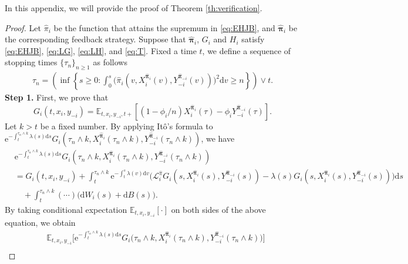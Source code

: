 \documentclass[11pt]{article}
\newcommand \drm {\mathrm{d}}
\newcommand \e {\mathrm{e}}
\numberwithin{equation}{section}
\renewcommand{\theequation}{\arabic{section}.\arabic{equation}}
\newcommand{\bpi}{\boldsymbol{\pi}}
\providecommand{\smn}{{-}} %
\begin{document}
	\setcounter{equation}{0}
	\renewcommand{\theequation}{A.\arabic{equation}}
	In this appendix, we will provide the proof of Theorem \ref{th:verification}.
	\begin{proof}
		Let \(\widehat{\pi}_i\) be the function that attains the supremum in \eqref{eq:EHJB}, and $\widehat{\bpi}_i$ be the corresponding feedback strategy. Suppose that \(\bm{\widehat{\pi}}_i\),
		\(G_i\) and \(H_i\) satisfy \eqref{eq:EHJB},  \eqref{eq:LG}, \eqref{eq:LH}, and \eqref{eq:T}. Fixed a time \(t\), we define a sequence of stopping times \(\{\tau_n\}_{n \ge 1}\) as follows
		\begin{align}
			\tau_n=\left(\inf\left\{s\geq 0:\int_0^s \big(\widehat{\pi}_i(v,X_i^{\widehat{\bm{\pi}}_i}(v),Y^{\widehat{\bpi}_{\smn i}}_{\smn i}(v))\big)^2 \drm v \geq n\right\}\right) \vee t.
		\end{align}
{\bf{Step 1.}} First, we prove that
\[	
G_i(t,x_i,y_{\smn i})=\mathbb{E}_{t,x_i,y_{\smn i},t+}\left[(1-\phi_i/n)X_i^{\widehat{\bm{\pi}}_i}(\tau)-\phi_i Y^{\widehat{\bpi}_{\smn i}}_{\smn i}(\tau)\right].
 \]
 Let \(k>t\) be a fixed number. By applying It\^{o}'s formula to \(\e^{-\int_t^{\tau_n\wedge k}\lambda(s)\drm s} G_i(\tau_n\wedge k,X_i^{\widehat{\bm{\pi}}_i}(\tau_n\wedge k),Y^{\widehat{\bpi}_{\smn i}}_{\smn i}(\tau_n\wedge k))\), we have
		\begin{align*}
			&\e^{-\int_t^{\tau_n\wedge k}\lambda(s)\drm s} G_i(\tau_n\wedge k,X_i^{\widehat{\bm{\pi}}_i}(\tau_n\wedge k),Y^{\widehat{\bpi}_{\smn i}}_{\smn i}(\tau_n\wedge k))\\
			&=G_i(t,x_i,y_{\smn i})+\int_t^{\tau_n\wedge k} \e^{-\int_t^s \lambda(v)\drm v}\Big(\mathcal{L}_i^{\widehat{\pi}}G_i(s,X_i^{\widehat{\bm{\pi}}_i}(s),Y^{\widehat{\bpi}_{\smn i}}_{\smn i}(s))-\lambda(s)G_i(s,X_i^{\widehat{\bm{\pi}}_i}(s),Y^{\widehat{\bpi}_{\smn i}}_{\smn i}(s))\Big)\drm s\\
			&\quad +\int_t^{\tau_n\wedge k}(\cdots)\big( \drm W_i(s) + \drm B(s)\big).
		\end{align*}
By taking conditional expectation \(\mathbb{E}_{t, x_i, y_{\smn i}}[\cdot]\) on both sides of the above equation, we obtain
		\begin{align}
			&	\mathbb{E}_{t,x_i,y_{\smn i}}\Big[\e^{-\int_t^{\tau_n\wedge k}\lambda(s)\drm s} G_i\big(\tau_n\wedge k,X_i^{\widehat{\bm{\pi}}_i}(\tau_n \wedge k),Y^{\widehat{\bpi}_{\smn i}}_{\smn i}(\tau_n \wedge k)\big)\Big]\\

\end{align}
\end{proof}
\end{document}
